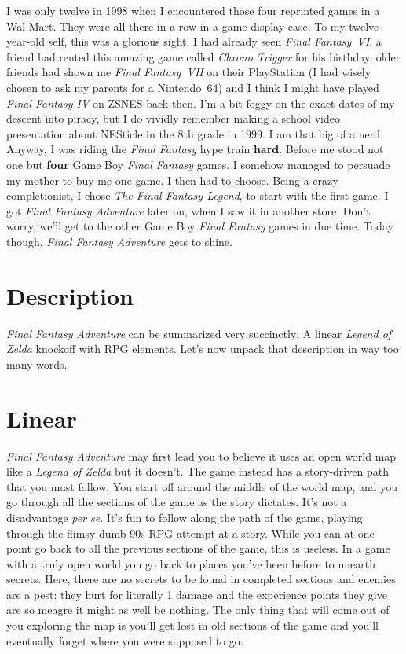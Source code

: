\documentclass{book}
\begin{document}
I was only twelve in 1998 when I encountered those four reprinted games in a Wal-Mart. They were all there in a row in a game display case. To my twelve-year-old self, this was a glorious sight. I had already seen \emph{Final Fantasy~VI}, a friend had rented this amazing game called \emph{Chrono Trigger} for his birthday, older friends had shown me \emph{Final Fantasy~VII} on their PlayStation (I had wisely chosen to ask my parents for a Nintendo~64) and I think I might have played \emph{Final Fantasy IV} on ZSNES back then. I’m a bit foggy on the exact dates of my descent into piracy, but I do vividly remember making a school video presentation about NESticle in the 8th grade in 1999. I am that big of a nerd. Anyway, I was riding the \emph{Final Fantasy} hype train \textbf{hard}. Before me stood not one but \textbf{four} Game Boy \emph{Final Fantasy} games. I somehow managed to persuade my mother to buy me one game. I then had to choose. Being a crazy completionist, I chose \emph{The Final Fantasy Legend}, to start with the first game. I got \emph{Final Fantasy Adventure} later on, when I saw it in another store. Don’t worry, we’ll get to the other Game Boy \emph{Final Fantasy} games in due time. Today though, \emph{Final Fantasy Adventure} gets to shine.\par
\FloatBarrier\section*{Description}
\emph{Final Fantasy Adventure} can be summarized very succinctly: A linear \emph{Legend of Zelda} knockoff with RPG elements. Let’s now unpack that description in way too many words.\par
\FloatBarrier\section*{Linear}
\emph{Final Fantasy Adventure} may first lead you to believe it uses an open world map like a \emph{Legend of Zelda} but it doesn’t. The game instead has a story-driven path that you must follow. You start off around the middle of the world map, and you go through all the sections of the game as the story dictates. It’s not a disadvantage \emph{per se}. It’s fun to follow along the path of the game, playing through the flimsy dumb 90s RPG attempt at a story. While you can at one point go back to all the previous sections of the game, this is useless. In a game with a truly open world you go back to places you’ve been before to unearth secrets. Here, there are no secrets to be found in completed sections and enemies are a pest: they hurt for literally 1 damage and the experience points they give are so meagre it might as well be nothing. The only thing that will come out of you exploring the map is you’ll get lost in old sections of the game and you’ll eventually forget where you were supposed to go.\par
\end{document}
